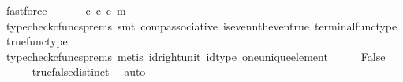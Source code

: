 \begin{isabellebody}
\ fastforce\isanewline
\ \ \isamarkupfalse%
\ \isamarkupfalse%
\ {\isachardoublequoteopen}{\isasymt}\ {\isasymcirc}\isactrlsub c\ {\isasymbeta}\isactrlbsub {\isasymnat}\isactrlsub c\isactrlesub \ {\isasymcirc}\isactrlsub c\ m\ {\isacharequal}{\kern0pt}\ {\isasymf}{\isachardoublequoteclose}\isanewline
\ \ \ \ \isamarkupfalse%
\ {\isacharparenleft}{\kern0pt}typecheck{\isacharunderscore}{\kern0pt}cfuncs{\isacharunderscore}{\kern0pt}prems{\isacharcomma}{\kern0pt}\ smt\ comp{\isacharunderscore}{\kern0pt}associative{}\ is{\isacharunderscore}{\kern0pt}even{\isacharunderscore}{\kern0pt}nth{\isacharunderscore}{\kern0pt}even{\isacharunderscore}{\kern0pt}true\ terminal{\isacharunderscore}{\kern0pt}func{\isacharunderscore}{\kern0pt}type\ true{\isacharunderscore}{\kern0pt}func{\isacharunderscore}{\kern0pt}type{\isacharparenright}{\kern0pt}\isanewline
\ \ \isamarkupfalse%
\ \isamarkupfalse%
\ {\isachardoublequoteopen}{\isasymt}\ {\isacharequal}{\kern0pt}\ {\isasymf}{\isachardoublequoteclose}\isanewline
\ \ \ \ \isamarkupfalse%
\ {\isacharparenleft}{\kern0pt}typecheck{\isacharunderscore}{\kern0pt}cfuncs{\isacharunderscore}{\kern0pt}prems{\isacharcomma}{\kern0pt}\ metis\ id{\isacharunderscore}{\kern0pt}right{\isacharunderscore}{\kern0pt}unit{}\ id{\isacharunderscore}{\kern0pt}type\ one{\isacharunderscore}{\kern0pt}unique{\isacharunderscore}{\kern0pt}element{\isacharparenright}{\kern0pt}\isanewline
\ \ \isamarkupfalse%
\ \isamarkupfalse%
\ False\isanewline
\ \ \ \ \isamarkupfalse%
\ true{\isacharunderscore}{\kern0pt}false{\isacharunderscore}{\kern0pt}distinct\ \isamarkupfalse%
\ auto\isanewline
{}\isamarkupfalse%
%
\endisatagproof
{\isafoldproof}%
%
\isadelimproof
\isanewline
%
\endisadelimproof
%
\isadelimtheory
\isanewline
%
\endisadelimtheory
%
\isatagtheory
{}\isamarkupfalse%
%
\endisatagtheory
{\isafoldtheory}%
%
\isadelimtheory
%
\endisadelimtheory
%
\end{isabellebody}%
\endinput
